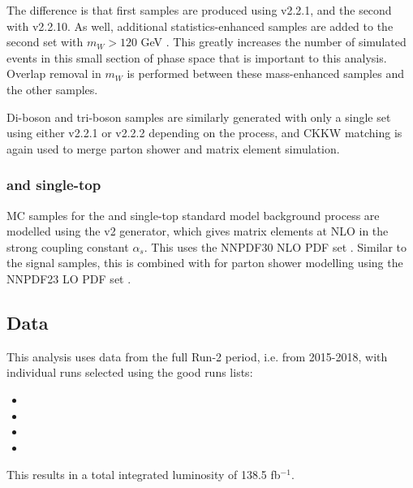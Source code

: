 The difference is that first samples are produced using \sherpa v2.2.1, and the second with \sherpa v2.2.10. As well, additional statistics-enhanced \wjets samples are added to the second set with $m_W > 120$ GeV \cite{VJets_mW}. This greatly increases the number of simulated events in this small section of phase space that is important to this analysis. Overlap removal in $m_W$ is performed between these mass-enhanced samples and the other \wjets samples.

Di-boson and tri-boson samples are similarly generated with only a single set using either \sherpa v2.2.1 or v2.2.2 depending on the process, and CKKW matching is again used to merge parton shower and matrix element simulation.

\subsubsection{\ttbar and single-top}
MC samples for the \ttbar and single-top standard model background process are modelled using the \powhegbox v2 \cite{Powheg} generator, which gives matrix elements at NLO in the strong coupling constant $\alpha_s$. This uses the NNPDF30 NLO PDF set \cite{PDF30}. Similar to the signal samples, this is combined with  \cite{Pythia} for parton shower modelling using the NNPDF23 LO PDF set \cite{PDF23}.

\subsection{Data}
This analysis uses data from the full Run-2 period, i.e. from 2015-2018, with individual runs selected using the good runs lists:
{ \scriptsize
\begin{itemize}
	\item \GRLa
	\item \GRLb
	\item \GRLc
	\item \GRLd
\end{itemize}
}
This results in a total integrated luminosity of 138.5 fb$^{-1}$.

